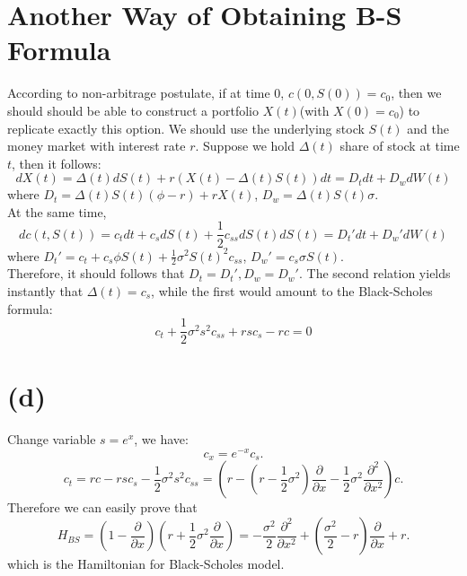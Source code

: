 \documentclass[12pt,a4paper]{paper}
\begin{document}
\section*{Another Way of Obtaining B-S Formula}
According to non-arbitrage postulate, if at time $0$, $c(0, S(0)) = c_0$, then we should should be able to construct a portfolio $X(t)$(with $X(0) = c_0$) to replicate exactly this option. We should use the underlying stock $S(t)$ and the money market with interest rate $r$. Suppose we hold $\Delta(t)$ share of stock at time $t$, then it follows:
\begin{equation}
dX(t) = \Delta(t)dS(t) + r(X(t) - \Delta(t)S(t))dt = D_tdt + D_w dW(t)
\end{equation}
where $D_t = \Delta(t)S(t)(\phi - r) + r X(t)$, $D_w = \Delta(t)S(t)\sigma$.\\
\indent At the same time,
\begin{equation}
dc(t, S(t)) = c_t dt + c_s dS(t) + \frac{1}{2} c_{ss} dS(t)dS(t) = D_t' dt + D_w'dW(t)
\end{equation}
where $D_t' = c_t + c_s \phi S(t) + \frac{1}{2}\sigma^2 S(t)^2c_{ss}$, $D_w' = c_s \sigma S(t)$. \\
\indent Therefore, it should follows that $D_t = D_t', D_w = D_w'$. The second relation yields instantly that $\Delta(t) = c_s$, while the first would amount to the Black-Scholes formula:
\begin{equation}
c_t + \frac{1}{2}\sigma^2 s^2 c_{ss} + rsc_s - rc = 0
\end{equation}

\section{(d)}
Change variable $s = e^x$, we have:
\begin{equation}
c_x = e^{-x}c_s.
\end{equation}
\begin{equation}
c_t = rc - rsc_s - \frac{1}{2}\sigma^2 s^2 c_{ss} = (r - (r - \frac{1}{2}\sigma^2)\frac{\partial}{\partial x} - \frac{1}{2}\sigma^2 \frac{\partial^2}{\partial x^2}) c.
\end{equation}
\indent Therefore we can easily prove that
\begin{equation} 
H_{BS} = (1 - \frac{\partial}{\partial x})(r + \frac{1}{2} \sigma^2 \frac{\partial}{\partial x})=-\frac{\sigma ^2}{2}\frac{\partial^2 }{\partial x^2}+(\frac{\sigma ^2}{2}-r)\frac{\partial }{\partial x}+r. 
\end{equation}
which is the Hamiltonian for Black-Scholes model.
\end{document}
